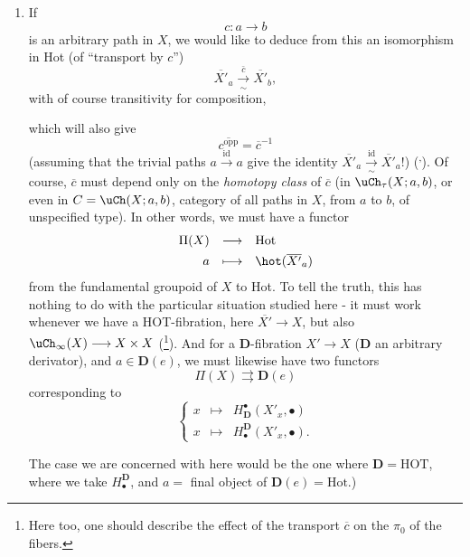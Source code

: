 \begin{enumerate}[label={}, leftmargin=*]
\item[4$^o$)] If
\[
c:a\longrightarrow b
\]
is an arbitrary path in $X$, we would like to deduce from this an isomorphism in Hot (of ``transport by $c$'') %
\[
\overline{X'}_a\xrightarrow[\sim]{\bar{c}}\overline{X'}_b,
\]
with of course transitivity for composition,


which will also give
\[
\overline{c^{\mathrm{opp}}}=\overline{c}^{-1}
\]
(assuming that the trivial paths $a\xrightarrow{\mathrm{id}}a$ give the identity $\overline{X'}_a\xrightarrow[\sim]{\mathrm{id}}\overline{X'}_a$!) (\footnotemark[32]\textsuperscript{,}\footnotemark[33]). Of course, $\overline{c}$ must depend only on the \textit{homotopy class} of $\overline{c}$ (in %
$\uCh_\tau(X;a,b)$, or even in $C=\uCh(X;a,b)$, category of all paths in $X$, from $a$ to $b$, of unspecified type). In other words, we must have a functor
\[
\begin{array}{rcl}
\Pi(X) & \longrightarrow & \mathrm{Hot}\\[4pt]
a & \longmapsto & \hot(\overline{X'}_a)
\end{array}
\]
from the fundamental groupoid of $X$ to Hot. To tell the truth, this has nothing to do with the particular situation studied here - it must work whenever we have a HOT-fibration, here $\overline{X'}\longrightarrow X$, but also $\uCh_\infty(X)\longrightarrow X\times X$ (\footnote[34]{Here too, one should describe the effect of the transport $\overline{c}$ on the $\pi_0$ of the fibers.}). And for a $\mathbf{D}$-fibration $X'\longrightarrow X$ ($\mathbf{D}$ an arbitrary derivator), and $a\in\mathbf{D}(e)$, we must likewise have two functors
\[
\Pi(X)\rightrightarrows\mathbf{D}(e)
\]
corresponding to
\[
\left\{\begin{array}{lcl}
x & \longmapsto & H^\bullet_{\mathbf{D}}(X'_x,\bullet)\\[4pt]
x & \longmapsto & H_\bullet^{\mathbf{D}}(X'_x,\bullet).
\end{array}\right.
\]


The case we are concerned with here would be the one where $\mathbf{D}=\mathrm{HOT}$, where we take $H^{\mathbf{D}}_\bullet$, and $a=$ final object of $\mathbf{D}(e)=\mathrm{Hot}$.)


\end{enumerate}
